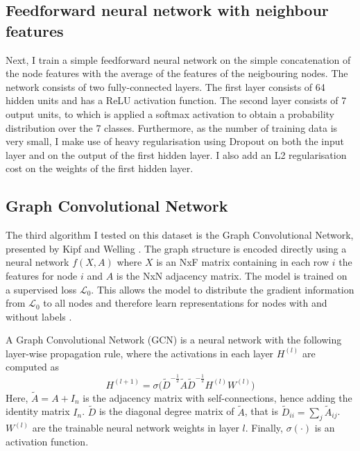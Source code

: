 \documentclass[12pt]{article}
\theoremstyle{definition}
\begin{document}
\subsection{Feedforward neural network with neighbour features}
Next, I train a simple feedforward neural network on the simple concatenation of the node features with the average of the features of the neigbouring nodes. The network consists of two fully-connected layers. The first layer consists of 64 hidden units and has a ReLU activation function. The second layer consists of 7 output units, to which is applied a softmax activation to obtain a probability distribution over the 7 classes. Furthermore, as the number of training data is very small, I make use of heavy regularisation using Dropout \cite{srivastava2014dropout} on both the input layer and on the output of the first hidden layer. I also add an L2 regularisation cost on the weights of the first hidden layer.

\subsection{Graph Convolutional Network}
The third algorithm I tested on this dataset is the Graph Convolutional Network, presented by Kipf and Welling \cite{kipf2017semi}. The graph structure is encoded directly using a neural network $f(X, A)$ where $X$ is an NxF matrix containing in each row $i$ the features for node $i$ and $A$ is the NxN adjacency matrix. The model is trained on a supervised loss $\mathcal{L}_0$. This allows the model to distribute the gradient information from $\mathcal{L}_0$ to all nodes and therefore learn representations for nodes with and without labels \cite{kipf2017semi}.

\bigskip

A Graph Convolutional Network (GCN) is a neural network with the following layer-wise propagation rule, where the activations in each layer $H^{(l)}$ are computed as
\[
H^{(l+1)} = \sigma \big( \tilde{D}^{-\frac{1}{2}} \tilde{A} \tilde{D}^{-\frac{1}{2}} H^{(l)} W^{(l)}\big)
\]
Here, $\tilde{A} = A + I_n$ is the adjacency matrix with self-connections, hence adding the identity matrix $I_n$. $\tilde{D}$ is the diagonal degree matrix of $\tilde{A}$, that is $\tilde{D}_{ii} = \sum_{j} \tilde{A}_{ij}$. $W^{(l)}$ are the trainable neural network weights in layer $l$. Finally, $\sigma(\cdot)$ is an activation function.

\bigskip
\end{document}
